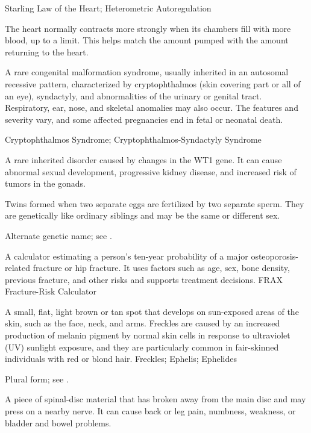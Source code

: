 \synonyms
Starling Law of the Heart; Heterometric Autoregulation

 The heart normally contracts more strongly when its chambers fill with more blood, up to a limit. This helps match the amount pumped with the amount returning to the heart.

 A rare congenital malformation syndrome, usually inherited in an
autosomal recessive pattern, characterized by cryptophthalmos (skin covering part or all of an eye),
syndactyly, and abnormalities of the urinary or genital tract. Respiratory, ear, nose, and skeletal
anomalies may also occur. The features and severity vary, and some affected pregnancies end in
fetal or neonatal death.

\synonyms
Cryptophthalmos Syndrome; Cryptophthalmos-Syndactyly Syndrome

 A rare inherited disorder caused by changes in the WT1 gene. It can cause abnormal sexual development, progressive kidney disease, and increased risk of tumors in the gonads.

 Twins formed when two separate eggs are fertilized by two separate sperm. They are genetically like ordinary siblings and may be the same or different sex.

 Alternate genetic name; see .

 A calculator estimating a person’s ten-year probability of a major osteoporosis-related fracture or hip fracture. It uses factors such as age, sex, bone density, previous fracture, and other risks and supports treatment decisions.
\synonyms
FRAX Fracture-Risk Calculator

 A small, flat, light brown or tan spot that develops on sun-exposed areas of the skin, such as the face, neck, and arms. Freckles are caused by an increased production of melanin pigment by normal skin cells in response to ultraviolet (UV) sunlight exposure, and they are particularly common in fair-skinned individuals with red or blond hair.
\synonyms
Freckles; Ephelis; Ephelides

 Plural form; see .

 A piece of spinal-disc material that has broken away from the main disc and may press on a nearby nerve. It can cause back or leg pain, numbness, weakness, or bladder and bowel problems.

